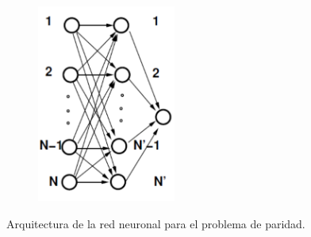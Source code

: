 \documentclass[11pt,twocolumn,twoside]{opticajnl}
\begin{document}
\begin{figure}[H]
    \centering
         \begin{subfigure}[b]{0.75\linewidth}
            \centering
            \includegraphics[width=0.5\textwidth]{Figuras/esquema2.png}
         \end{subfigure}
    \caption{Arquitectura de la red neuronal para el problema de paridad.} 
    \label{fig:esq_2}
\end{figure}
\end{document}
